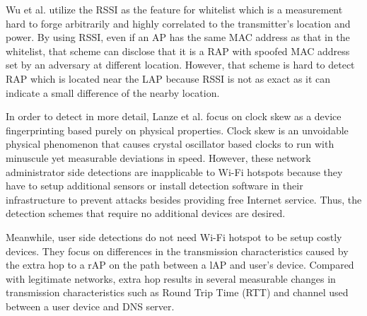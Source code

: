 \documentclass[conference]{IEEEtran}
\begin{document}
Wu et al. \cite{prapd} utilize the RSSI as the feature for whitelist which is a measurement hard to forge arbitrarily and highly correlated to the transmitter's location and power. 
By using RSSI, even if an AP has the same MAC address as that in the whitelist, that scheme can disclose that it is a RAP with spoofed MAC address set by an adversary at different location.
However, that scheme is hard to detect RAP which is located near the LAP because RSSI is not as exact as it can indicate a small difference of the nearby location. 

In order to detect in more detail, Lanze et al. \cite{clockskew} focus on clock skew as a device fingerprinting based purely on physical properties.
Clock skew is an unvoidable physical phenomenon that causes crystal oscillator based clocks to run with minuscule yet measurable deviations in speed.
However, these network administrator side detections are inapplicable to Wi-Fi hotspots because they have to setup additional sensors or install detection software in their infrastructure to prevent attacks besides providing free Internet service.
Thus, the detection schemes that require no additional devices are desired.

Meanwhile, user side detections do not need Wi-Fi hotspot to be setup costly devices. 
They focus on differences in the transmission characteristics caused by the extra hop to a rAP on the path between a lAP and user's device. 
Compared with legitimate networks, extra hop results in several measurable changes in transmission characteristics such as Round Trip Time (RTT) and channel used between a user device and DNS server.
\end{document}
